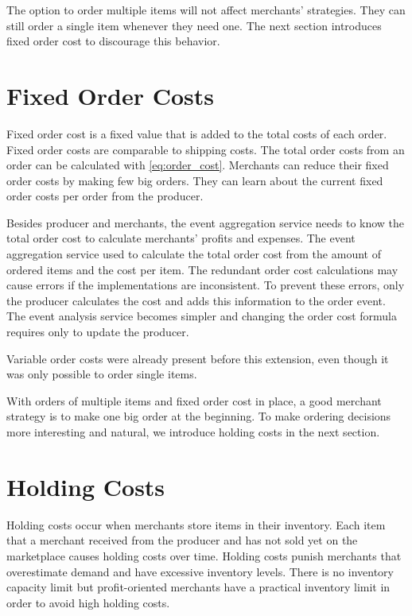 The option to order multiple items will not affect merchants' strategies.
They can still order a single item whenever they need one.
The next section introduces fixed order cost to discourage this behavior.

\section{Fixed Order Costs}
\label{section:fixed_order_cost}
Fixed order cost is a fixed value that is added to the total costs of each order.
Fixed order costs are comparable to shipping costs.
The total order costs from an order can be calculated with \cref{eq:order_cost}.
Merchants can reduce their fixed order costs by making few big orders.
They can learn about the current fixed order costs per order from the producer.

Besides producer and merchants, the event aggregation service needs to know the total order cost to calculate merchants' profits and expenses.
The event aggregation service used to calculate the total order cost from the amount of ordered items and the cost per item.
The redundant order cost calculations may cause errors if the implementations are inconsistent.
To prevent these errors, only the producer calculates the cost and adds this information to the order event.
The event analysis service becomes simpler and changing the order cost formula requires only to update the producer.

Variable order costs were already present before this extension, even though it was only possible to order single items.

With orders of multiple items and fixed order cost in place, a good merchant strategy is to make one big order at the beginning.
To make ordering decisions more interesting and natural, we introduce holding costs in the next section.

\section{Holding Costs}
\label{section:holding_cost}
Holding costs occur when merchants store items in their inventory.
Each item that a merchant received from the producer and has not sold yet on the marketplace causes holding costs over time.
Holding costs punish merchants that overestimate demand and have excessive inventory levels.
There is no inventory capacity limit but profit-oriented merchants have a practical inventory limit in order to avoid high holding costs.

